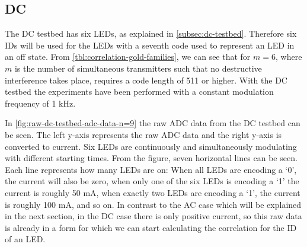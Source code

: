 
\subsection{DC}
\label{subsec:dc-testbed-eval}

The DC testbed has six LEDs, as explained in \autoref{subsec:dc-testbed}.
Therefore six IDs will be used for the LEDs with a seventh code used to represent an LED in an off state.
From \autoref{tbl:correlation-gold-families}, we can see that for $m = 6$, where $m$ is the number of simultaneous transmitters such that no destructive interference takes place, requires a code length of 511 or higher.
With the DC testbed the experiments have been performed with a constant modulation frequency of 1 kHz.

In \autoref{fig:raw-dc-testbed-adc-data-n=9} the raw ADC data from the DC testbed can be seen.
The left y-axis represents the raw ADC data and the right y-axis is converted to current.
Six LEDs are continuously and simultaneously modulating with different starting times.
From the figure, seven horizontal lines can be seen.
Each line represents how many LEDs are on: When all LEDs are encoding a `0', the current will also be zero, when only one of the six LEDs is encoding a `1' the current is roughly 50 mA, when exactly two LEDs are encoding a `1', the current is roughly 100 mA, and so on.
In contrast to the AC case which will be explained in the next section, in the DC case there is only positive current, so this raw data is already in a form for which we can start calculating the correlation for the ID of an LED.

